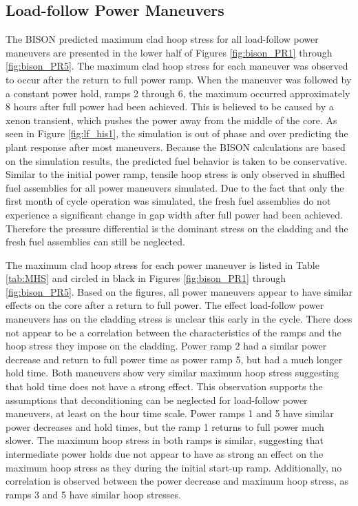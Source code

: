 \documentclass[edeposit,fullpage,11pt]{uiucthesis2009}
\begin{document}
\subsection{Load-follow Power Maneuvers}

The BISON predicted maximum clad hoop stress for all load-follow power maneuvers are presented in the lower half of Figures \ref{fig:bison_PR1} through \ref{fig:bison_PR5}.
The maximum clad hoop stress  for each maneuver was observed to occur after the return to full power ramp.
When the maneuver was followed by a constant power hold, ramps 2 through 6, the maximum occurred approximately 8 hours after full power had been achieved.
This is believed to be caused by a xenon transient, which pushes the power away from the middle of the core.
As seen in Figure \ref{fig:lf_his1}, the simulation is out of phase and over predicting the plant response after most maneuvers.
Because the BISON calculations are based on the simulation results, the predicted fuel behavior is taken to be conservative.
Similar to the initial power ramp, tensile hoop stress is only observed in shuffled fuel assemblies for all power maneuvers simulated.
Due to the fact that only the first month of cycle operation was simulated, the fresh fuel assemblies do not experience a significant change in gap width after full power had been achieved.
Therefore the pressure differential is the dominant stress on the cladding and the fresh fuel assemblies can still be neglected.

The maximum clad hoop stress for each power maneuver is listed in Table \ref{tab:MHS} and circled in black in Figures \ref{fig:bison_PR1} through \ref{fig:bison_PR5}. 
Based on the figures, all power maneuvers appear to have similar effects on the core after a return to full power.
The effect load-follow power maneuvers has on the cladding stress is unclear this early in the cycle.
There does not appear to be a correlation between the characteristics of the ramps and the hoop stress they impose on the cladding.
Power ramp 2 had a similar power decrease and return to full power time as power ramp 5, but had a much longer hold time.
Both maneuvers show very similar maximum hoop stress suggesting that hold time does not have a strong effect.
This observation supports the assumptions that deconditioning can be neglected for load-follow power maneuvers, at least on the hour time scale.
Power ramps 1 and 5 have similar power decreases and hold times, but the ramp 1 returns to full power much slower.
The maximum hoop stress in both ramps is similar, suggesting that intermediate power holds due not appear to have as strong an effect on the maximum hoop stress as they during the initial start-up ramp.
Additionally, no correlation is observed between the power decrease and maximum hoop stress, as ramps 3 and 5 have similar hoop stresses.
\end{document}
